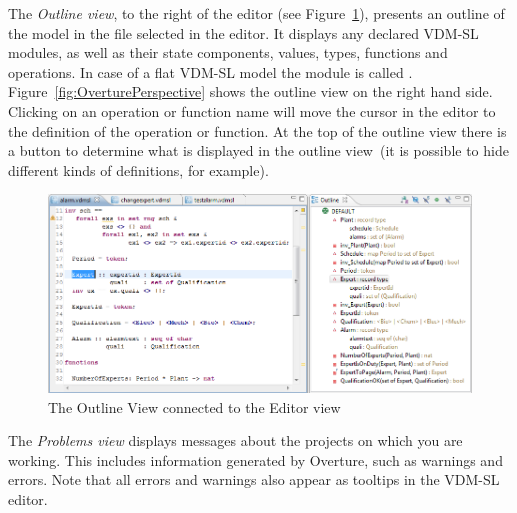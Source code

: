 %
The \emph{Outline view}, to the right of the editor (see Figure~\ref{fig:OutlineView}), presents an outline of the model in the file selected in the editor. It displays any declared VDM-SL modules, as well as their state components, values, types, functions and operations. In case of a flat VDM-SL model the module is called {}.
Figure~\ref{fig:OverturePerspective} shows the outline view on the right hand side. Clicking on an operation or function name will move the cursor in the editor to the definition of the operation or function. At the top of the outline view there is a button to determine what is displayed in the outline view~(it is possible to hide different kinds of definitions, for example).
%
\begin{figure}[!htb]
\begin{center}
  \includegraphics[width=4.5in]{figures/OutlineView}
  \caption[labelInTOC]{The Outline View connected to the Editor view}
  \label{fig:OutlineView}
\end{center}
\end{figure}
%
The \emph{Problems view} displays messages about the projects on which you are working. This includes information generated by Overture, such as warnings and errors. Note that all errors and warnings also appear as tooltips in the VDM-SL editor.

